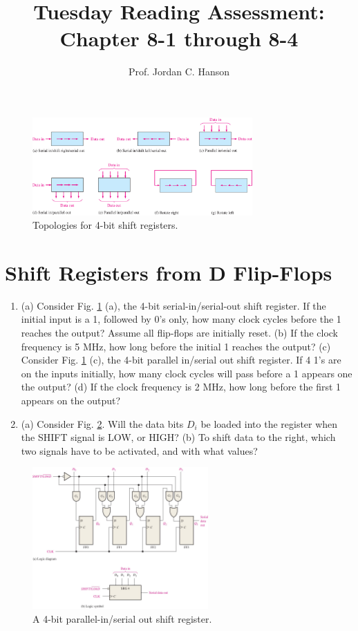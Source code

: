 \documentclass{article}
\begin{document}
\title{Tuesday Reading Assessment: Chapter 8-1 through 8-4}
\author{Prof. Jordan C. Hanson}

\maketitle

\begin{figure}[ht]
\centering
\includegraphics[width=0.75\textwidth,trim=0cm 6cm 0cm 0cm,clip=true]{figures/shift_1.jpg}
\caption{\label{fig:1} Topologies for 4-bit shift registers.}
\end{figure}

\section{Shift Registers from D Flip-Flops}

\begin{enumerate}
\item (a) Consider Fig. \ref{fig:1} (a), the 4-bit serial-in/serial-out shift register.  If the initial input is a 1, followed by 0's only, how many clock cycles before the 1 reaches the output?  Assume all flip-flops are initially reset. (b) If the clock frequency is 5 MHz, how long before the initial 1 reaches the output? (c) Consider Fig. \ref{fig:1} (c), the 4-bit parallel in/serial out shift register.  If 4 1's are on the inputs initially, how many clock cycles will pass before a 1 appears one the output? (d) If the clock frequency is 2 MHz, how long before the first 1 appears on the output? \\ \vspace{2cm}
\item (a) Consider Fig. \ref{fig:2}.  Will the data bits $D_i$ be loaded into the register when the SHIFT signal is LOW, or HIGH? (b) To shift data to the right, which two signals have to be activated, and with what values? \\ \vspace{1cm}
\end{enumerate}

\begin{figure}[hb]
\centering
\includegraphics[width=0.6\textwidth,trim=0cm 5cm 0cm 0cm,clip=true]{figures/shift_2.jpg}
\caption{\label{fig:2} A 4-bit parallel-in/serial out shift register.}
\end{figure}
\end{document}
